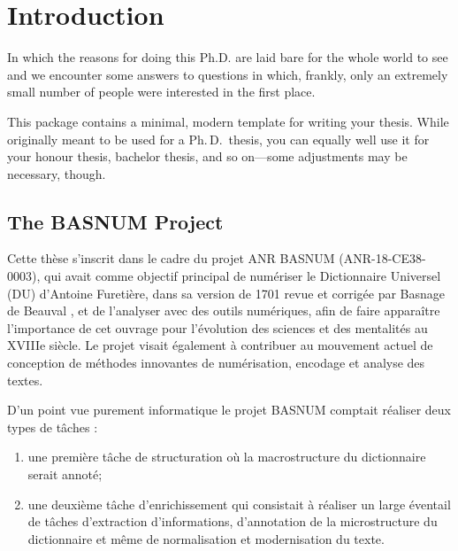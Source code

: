 \chapter{Introduction}

\begin{center}
  \begin{minipage}{0.5\textwidth}
    \begin{small}
      In which the reasons for doing this Ph.D. are laid bare for the whole world to see and we encounter some answers to questions in which, frankly, only an extremely small number of people were interested in the first place.
    \end{small}
  \end{minipage}
  \vspace{0.5cm}
\end{center}

\noindent This package contains a minimal, modern template for writing your
thesis. While originally meant to be used for a Ph.\,D.\ thesis, you can
equally well use it for your honour thesis, bachelor thesis, and so
on---some adjustments may be necessary, though.

\section{The BASNUM Project}

Cette thèse s'inscrit dans le cadre du projet ANR BASNUM (ANR-18-CE38-0003), qui avait comme objectif principal de numériser le Dictionnaire Universel (DU) d'Antoine Furetière, dans sa version de 1701 revue et corrigée par Basnage de Beauval \citep{furetiere-1701-dictionnaire}, et de l'analyser avec des outils numériques, afin de faire apparaître l'importance de cet ouvrage pour l'évolution des sciences et des mentalités au XVIIIe siècle. Le projet visait également à contribuer au mouvement actuel de conception de méthodes innovantes de numérisation, encodage et analyse des textes.

D'un point vue purement informatique le projet BASNUM comptait réaliser deux types de tâches :
\begin{enumerate}
  \item une première tâche de structuration où la macrostructure du dictionnaire serait annoté;
  \item une deuxième tâche d'enrichissement qui consistait à réaliser un large éventail de tâches d'extraction d'informations, d'annotation de la microstructure du dictionnaire et même de normalisation et modernisation du texte.
\end{enumerate}

